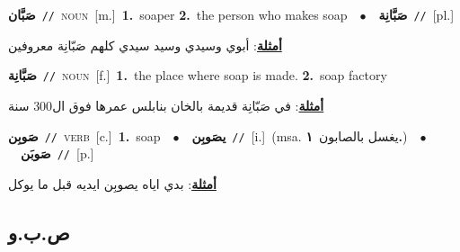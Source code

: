\documentclass[10pt,a4paper,twoside]{article} %
\begin{document}
\begin{multicols}{2}
{{{{{{{{{\setlength\topsep{0pt}\textbf{\foreignlanguage{arabic}{صَبَّان}}\ {\color{gray}\texttt{//}\color{black}}\ \textsc{noun}\ [m.]\ \textbf{1.}~soaper  \textbf{2.}~the person who makes soap\ \ $\bullet$\ \ \setlength\topsep{0pt}\textbf{\foreignlanguage{arabic}{صَبَّانِة}}\ {\color{gray}\texttt{//}\color{black}}\ [pl.]\  \begin{flushright}\color{gray}\foreignlanguage{arabic}{\textbf{\underline{\foreignlanguage{arabic}{أمثلة}}}: أبوي وسيدي وسيد سيدي كلهم صَبّانِة معروفين}\end{flushright}\color{black}} \vspace{2mm}

{\setlength\topsep{0pt}\textbf{\foreignlanguage{arabic}{صَبَّانِة}}\ {\color{gray}\texttt{//}\color{black}}\ \textsc{noun}\ [f.]\ \textbf{1.}~the place where soap is made.  \textbf{2.}~soap factory\  \begin{flushright}\color{gray}\foreignlanguage{arabic}{\textbf{\underline{\foreignlanguage{arabic}{أمثلة}}}: في صَبّانِة قديمة بالخان بنابلس عمرها فوق ال300 سنة}\end{flushright}\color{black}} \vspace{2mm}

{\setlength\topsep{0pt}\textbf{\foreignlanguage{arabic}{صَوبِن}}\ {\color{gray}\texttt{//}\color{black}}\ \textsc{verb}\ [c.]\ \textbf{1.}~soap\ \ $\bullet$\ \ \setlength\topsep{0pt}\textbf{\foreignlanguage{arabic}{يصَوبِن}}\ {\color{gray}\texttt{//}\color{black}}\ [i.]\ \color{gray}(msa. \foreignlanguage{arabic}{يغسل بالصابون}~\foreignlanguage{arabic}{\textbf{١.}})\color{black}\ \ $\bullet$\ \ \setlength\topsep{0pt}\textbf{\foreignlanguage{arabic}{صَوبَن}}\ {\color{gray}\texttt{//}\color{black}}\ [p.]\  \begin{flushright}\color{gray}\foreignlanguage{arabic}{\textbf{\underline{\foreignlanguage{arabic}{أمثلة}}}: بدي اياه يصوبِن ايديه قبل ما يوكل}\end{flushright}\color{black}} \vspace{2mm}

\vspace{-3mm}
\subsection*{\color{blue}\foreignlanguage{arabic}{ص.ب.و}\color{blue}{}} 

}}}}}}}}
\end{multicols}
\end{document}

